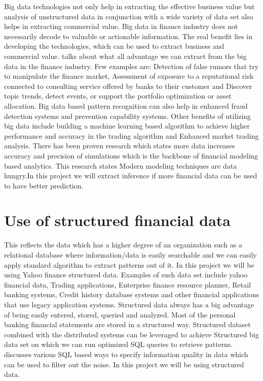 \indent

Big data technologies not only help in extracting the effective business value but analysis of unstructured data in conjunction with a wide variety of data set 
also helps in extracting commercial value. Big data in finance industry does not necessarily decode to valuable or actionable information.
The real benefit lies in developing the technologies, which can be used to extract business and commercial value.  
\cite{Ref4}  talks about what all advantage we can extract from the big data in the finance industry. Few examples are: Detection of false rumors that try to
 manipulate the finance market, Assessment of exposure to a reputational risk connected to consulting service offered by banks to their customer and Discover 
 topic trends, detect events, or support the portfolio optimization or asset allocation.  Big data based pattern recognition can also help in enhanced fraud 
 detection systems and prevention capability systems. Other benefits of utilizing big data include building a machine learning based algorithm to achieve higher 
 performance and accuracy in the trading algorithm and Enhanced market trading analysis. There has been proven research \cite{Ref5} which states more data increases
 accuracy and precision of simulations which is the backbone of financial modeling based analytics. This research \cite{Ref5} states Modern modeling techniques
 are data hungry.In this project we will extract inference if more financial data can be used to have better prediction.  


\section{Use of structured financial data}


This reflects the data which has a higher degree of an organization such as a relational database where information/data is easily searchable and we can easily 
apply standard algorithm to extract patterns out of it. In this project we will be using Yahoo finance structured data. Examples of such data set include
yahoo financial data, Trading applications, Enterprise finance resource planner, Retail banking 
systems, Credit history database systems and other financial applications that use legacy application systems. Structured data always has a big advantage of 
being easily entered, stored, queried and analyzed. Most of the personal banking financial statements are stored in a structured way.
 Structured dataset combined with the distributed systems can be leveraged to achieve Structured big data set on which we can run optimized SQL queries to
 retrieve patterns. \cite{Ref6}  discusses various SQL based ways to specify information quality in data which can be used to filter out the noise. In this project 
 we will be using structured data. 

